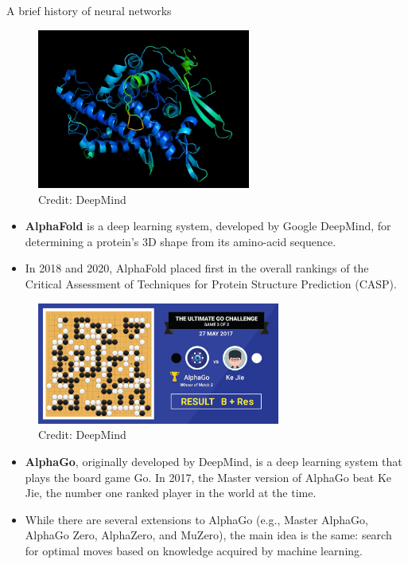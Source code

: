 \begin{vbframe}{A brief history of neural networks}
\begin{figure}
\centering
\includegraphics[width=7cm]{figure/alphafold.jpg}
\\
\tiny {Credit: DeepMind}
\end{figure}
\footnotesize
\begin{itemize}
\item\textbf{AlphaFold} is a deep learning system, developed by Google DeepMind, for determining a protein's 3D shape from its amino-acid sequence.
\vspace{.1cm}
\item In 2018 and 2020, AlphaFold placed first in the overall rankings of the Critical Assessment of Techniques for Protein Structure Prediction (CASP).
\end{itemize}
\framebreak
\begin{figure}
\centering
\includegraphics[width=8cm]{figure/alphago.png}
\\
\tiny {Credit: DeepMind}
\end{figure}
\footnotesize
\begin{itemize}
\item\textbf{AlphaGo}, originally developed by DeepMind, is a deep learning system that plays the board game Go. In 2017, the Master version of AlphaGo beat Ke Jie, the number one ranked player in the world at the time.
\vspace{.1cm}
\item While there are several extensions to AlphaGo (e.g., Master AlphaGo, AlphaGo Zero, AlphaZero, and MuZero), the main idea is the same: search for optimal moves based on knowledge acquired by machine learning.
\end{itemize}
\framebreak


\end{vbframe}
